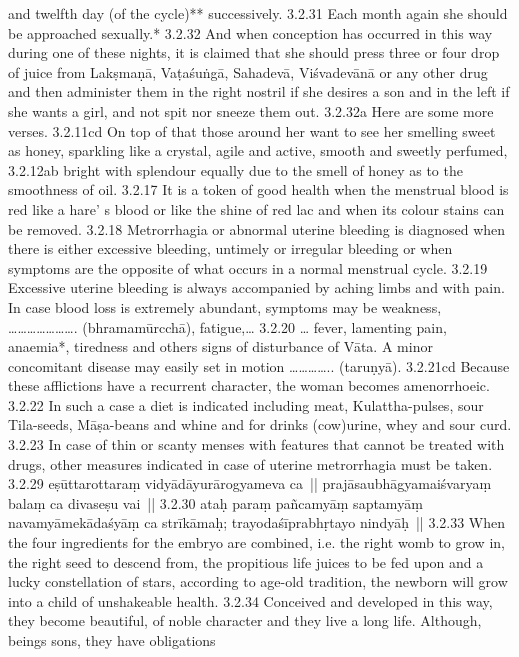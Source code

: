 \begin{translation}
  and twelfth day (of the cycle)** successively.
  3.2.31 Each month again she should be approached sexually.* 
  3.2.32 And when conception has occurred in this way during one of these 
  nights, it is claimed that she should press three or four drop of juice from 
  Lakṣmaṇā, Vaṭaśuṅgā, Sahadevā, Viśvadevānā or any other drug and then 
  administer them in the right nostril if she desires a son and in the left if she 
  wants a girl, and not spit nor sneeze them out. 
  3.2.32a Here are some more verses.
  3.2.11cd On top of that those around her want to see her smelling sweet as 
  honey, sparkling like a crystal, agile and active, smooth and sweetly perfumed, 
  3.2.12ab bright with splendour equally due to the smell of honey as to the 
  smoothness of oil. 
  3.2.17 It is a token of good health when the menstrual blood is red like a hare’ s 
  blood or like the shine of red lac and when its colour stains can be removed.
  3.2.18 Metrorrhagia or abnormal uterine bleeding is diagnosed when there is 
  either excessive bleeding, untimely or irregular bleeding or when symptoms are 
  the opposite of what occurs in a normal menstrual cycle. 
  3.2.19  Excessive uterine bleeding is always accompanied by aching limbs and 
  with pain. In case blood loss is extremely abundant, symptoms may be 
  weakness, …………………. (bhramamūrcchā), fatigue,…
  3.2.20 … fever, lamenting pain, anaemia*, tiredness and others signs of 
  disturbance of Vāta. A minor concomitant disease may easily set in motion 
  ………….. (taruṇyā).
  3.2.21cd Because these afflictions have a recurrent character, the woman 
  becomes amenorrhoeic. 
  3.2.22 In such a case a diet is indicated including meat, Kulattha-pulses, sour 
  Tila-seeds, Māṣa-beans and whine and for drinks (cow)urine, whey and sour 
  curd.
  3.2.23 In case of thin or scanty menses with features that cannot be treated 
  with drugs, other measures indicated in case of uterine metrorrhagia must be 
  taken. 
  3.2.29 
  eṣūttarottaraṃ vidyādāyurārogyameva ca || prajāsaubhāgyamaiśvaryaṃ balaṃ 
  ca divaseṣu vai ||
  3.2.30 
  ataḥ paraṃ pañcamyāṃ saptamyāṃ navamyāmekādaśyāṃ ca strīkāmaḥ; 
  trayodaśīprabhṛtayo nindyāḥ ||
  3.2.33  When the four ingredients for the embryo are combined, i.e. the right 
  womb to grow in, the right seed to descend from, the propitious life juices to be 
  fed upon and a lucky constellation of stars, according to age-old tradition, the 
  newborn will grow into a child of unshakeable health. 
  3.2.34 Conceived and developed in this way, they become beautiful, of noble 
  character and they live a long life. Although, beings sons, they have obligations 

\end{translation}
